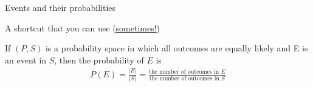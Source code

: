 \documentclass[10pt]{beamer}
\begin{document}
\begin{frame}{Events and their probabilities}
%


\end{frame}



\begin{frame}{A shortcut that you can use (\underline{sometimes!})}
\begin{mygreenbox}[title=\text{Proposition: Equally Likely Probability Formula}]
If $(P,S)$ is a probability space in which all outcomes are equally likely and E is an event in $S$, then the probability of $E$ is
%
\begin{align*}
P(E) = \frac{|E|}{|S|} = \frac{\text{the number of outcomes in } E }{\text{the number of outcomes in } S}	
\end{align*}
\end{mygreenbox}

\vfill 
{}

%

\end{frame}
\end{document}
